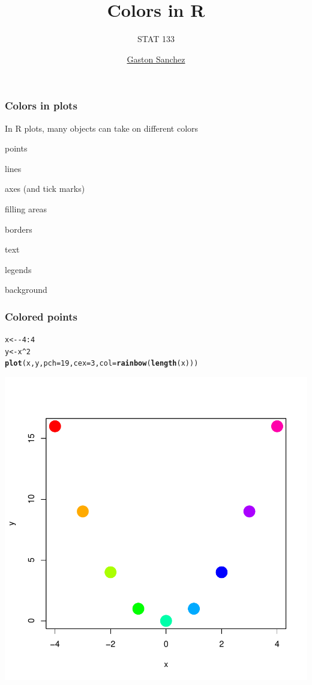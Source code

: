 \documentclass[12pt]{beamer}\usepackage[]{graphicx}\usepackage[]{color}
\title{Colors in R}
\subtitle{STAT 133}
\author{\href{http://www.gastonsanchez.com}{Gaston Sanchez}}
\institute{\href{https://github.com/ucb-stat133/stat133-fall-2016}{\tt \scriptsize \color{foreground} github.com/ucb-stat133/stat133-fall-2016}}
\date{}
\makeatletter
\newcommand{\hlnum}[1]{\textcolor[rgb]{0.686,0.059,0.569}{#1}}%
\newcommand{\hlopt}[1]{\textcolor[rgb]{0,0,0}{#1}}%
\newcommand{\hlstd}[1]{\textcolor[rgb]{0.345,0.345,0.345}{#1}}%
\newcommand{\hlkwb}[1]{\textcolor[rgb]{0.69,0.353,0.396}{#1}}%
\newcommand{\hlkwc}[1]{\textcolor[rgb]{0.333,0.667,0.333}{#1}}%
\newcommand{\hlkwd}[1]{\textcolor[rgb]{0.737,0.353,0.396}{\textbf{#1}}}%
\newenvironment{kframe}{%
 \def\at@end@of@kframe{}%
 \ifinner\ifhmode%
  \def\at@end@of@kframe{\end{minipage}}%
  \begin{minipage}{\columnwidth}%
 \fi\fi%
 \def\FrameCommand##1{\hskip\@totalleftmargin \hskip-\fboxsep
 \colorbox{shadecolor}{##1}\hskip-\fboxsep
     \hskip-\linewidth \hskip-\@totalleftmargin \hskip\columnwidth}%
 \MakeFramed {\advance\hsize-\width
   \@totalleftmargin\z@ \linewidth\hsize
   \@setminipage}}%
 {\par\unskip\endMakeFramed%
 \at@end@of@kframe}
\newenvironment{knitrout}{}{} %
\makeatother
\begin{document}
{
  \frame{
    \titlepage
  } 
}


\begin{frame}
\begin{center}
\Huge{}
\end{center}
\end{frame}


\begin{frame}
\frametitle{Colors in plots}

In R plots, many objects can take on different colors
\bi
  \item points
  \item lines
  \item axes (and tick marks)
  \item filling areas
  \item borders
  \item text
  \item legends
  \item background
 \ei
\eb

\end{frame}


\begin{frame}[fragile]
\frametitle{Colored points}

\begin{knitrout}\scriptsize
{}\color{fgcolor}\begin{kframe}
\begin{alltt}
\hlstd{x} \hlkwb{<-} \hlopt{-}\hlnum{4}\hlopt{:}\hlnum{4}
\hlstd{y} \hlkwb{<-} \hlstd{x}\hlopt{^}\hlnum{2}
\hlkwd{plot}\hlstd{(x, y,} \hlkwc{pch} \hlstd{=} \hlnum{19}\hlstd{,} \hlkwc{cex} \hlstd{=} \hlnum{3}\hlstd{,} \hlkwc{col} \hlstd{=} \hlkwd{rainbow}\hlstd{(}\hlkwd{length}\hlstd{(x)))}
\end{alltt}
\end{kframe}

{\centering \includegraphics[width=.4\linewidth,height=.4\linewidth]{figure/points_colored1-1} 

}



\end{knitrout}

\end{frame}
\end{document}
